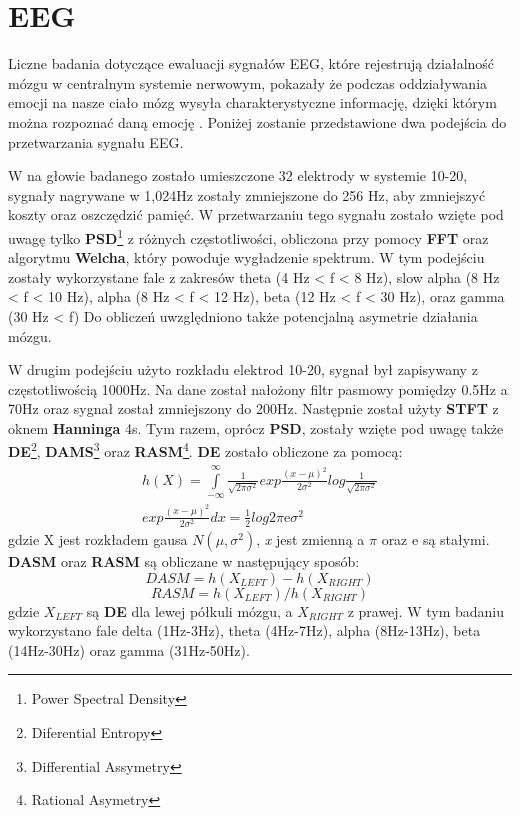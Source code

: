 \documentclass[10pt,journal,compsoc,twoside]{IEEEtran}
\newcommand{\me}{\mathrm{e}}
\begin{document}
\section{EEG}
Liczne badania dotyczące ewaluacji sygnałów EEG, które rejestrują działalność mózgu w centralnym systemie nerwowym, pokazały że podczas oddziaływania emocji na nasze ciało mózg wysyła charakterystyczne informację, dzięki którym można rozpoznać daną emocję \cite{AdolphsTranesDamasio2003}\cite{DamasioGrabowski2000}. 
Poniżej zostanie przedstawione dwa podejścia do przetwarzania sygnału EEG.
\newline\par W \cite{SoleymaniPanticPun2002} na głowie badanego zostało umieszczone 32 elektrody w systemie 10-20, sygnały nagrywane w 1,024Hz zostały zmniejszone do 256 Hz, aby zmniejszyć koszty oraz oszczędzić pamięć. W przetwarzaniu tego sygnału zostało wzięte pod uwagę tylko \textbf{PSD}\footnote{ Power Spectral Density } z różnych częstotliwości, obliczona przy pomocy \textbf{FFT} oraz algorytmu \textbf{Welcha}, który powoduje wygładzenie spektrum. W tym podejściu zostały wykorzystane fale z zakresów theta (4 Hz < f < 8 Hz),
slow alpha (8 Hz < f < 10 Hz), alpha (8 Hz < f < 12 Hz),
beta (12 Hz < f < 30 Hz), oraz gamma (30 Hz < f)
Do obliczeń uwzględniono także potencjalną asymetrie działania mózgu.
\newline\par
W drugim podejściu \cite{WeiLongBoNanBaoLiang2014} użyto rozkładu elektrod 10-20, sygnał był zapisywany z częstotliwością 1000Hz. Na dane został nałożony filtr pasmowy pomiędzy 0.5Hz a 70Hz oraz sygnał został zmniejszony do 200Hz. Następnie został użyty \textbf{STFT} z oknem \textbf{Hanninga} 4s. Tym razem, oprócz \textbf{PSD}, zostały wzięte pod uwagę także \textbf{DE}\footnote{Diferential Entropy}, \textbf{DAMS}\footnote{Differential Assymetry} oraz \textbf{RASM}\footnote{Rational Asymetry}. \textbf{DE} zostało obliczone za pomocą:
\begin{equation}
  \begin{aligned}
h(X)=\int\limits_{-\infty}^{\infty} \frac{1}{\sqrt{2\pi\sigma^{2}}}exp \frac{(x - \mu)^{2}}{2\sigma^{2}}log\frac{1}{\sqrt{2\pi\sigma^{2}}}\\ exp\frac{(x - \mu)^{2}}{2\sigma^{2}}dx = \frac{1}{2}log2\pi \me \sigma^{2}
  \end{aligned}
\end{equation}
gdzie X jest rozkładem gausa $N(\mu, \sigma^2)$, \textit{x} jest zmienną a $\pi$ oraz $\me$ są stałymi. \textbf{DASM} oraz \textbf{RASM} są obliczane w następujący sposób:
\begin{equation}
DASM = h(X_{LEFT}) - h(X_{RIGHT})
\end{equation}
\begin{equation}
RASM = h(X_{LEFT}) / h(X_{RIGHT})
\end{equation}
gdzie $X_{LEFT}$ są \textbf{DE} dla lewej półkuli mózgu, a $X_{RIGHT}$ z prawej. 
W tym badaniu wykorzystano fale  delta (1Hz-3Hz), theta (4Hz-7Hz), alpha (8Hz-13Hz), beta (14Hz-30Hz) oraz gamma (31Hz-50Hz).
\end{document}
